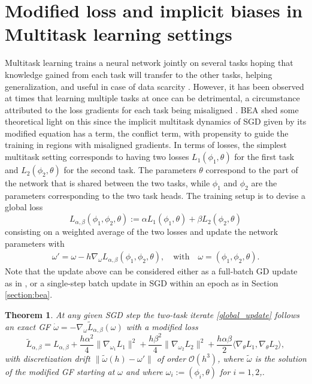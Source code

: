 \documentclass{article}
\newtheorem{theorem}{Theorem}[section]
\begin{document}
\section{Modified loss and implicit biases in Multitask learning settings}

Multitask learning trains a neural network jointly on several tasks hoping that knowledge gained from each task will transfer to the other tasks, helping generalization, and useful in case of data scarcity \cite{ruder2017overview,zhang2021survey}. However, it has been observed at times that learning multiple tasks at once can be detrimental, a circumstance attributed to the loss gradients for each task being misaligned \cite{yu2020gradient_surgery,wang2021gradient_vaccine,lee2022sequential,anguelov2020_pick_a_sign}. BEA shed some theoretical light on this since the implicit multitask dynamics of SGD given by its modified equation has a term, the conflict term, with propensity to guide the training in regions with misaligned gradients. In terms of losses, the simplest multitask setting corresponds to having two losses $L_1(\phi_1, \theta)$ for the first task
and $L_2(\phi_2, \theta)$ for the second task. The parameters $\theta$ correspond to the part of the network
that is shared between the two tasks, while $\phi_1$ and $\phi_2$ are the parameters corresponding to the two task heads. 
The training setup is to devise a global loss 
\begin{equation}\label{eq:multitask_loss}
    L_{\alpha, \beta}(\phi_1, \phi_2, \theta) := \alpha L_1(\phi_1, \theta) + \beta L_2(\phi_2, \theta)
\end{equation}
consisting on a weighted average of the two losses and update the network parameters with 
\begin{eqnarray}
\omega' = \omega - h \nabla_\omega L_{\alpha, \beta}(\phi_1, \phi_2, \theta),
\label{global_update}
\quad\textrm{with}\quad \omega = (\phi_1, \phi_2, \theta).
\end{eqnarray}
Note that the update above can be considered either as a full-batch GD update as in \cite{barrett2021implicit}, or a single-step batch update in SGD within an epoch as in Section \ref{section:bea}.


\begin{theorem}
At any given SGD step the two-task iterate \eqref{global_update} follows an exact GF $\dot \omega = -\nabla_\omega \widetilde L_{\alpha, \beta}(\omega)$ with a modified loss
\begin{equation}\label{eq:two_task_mod_loss}
\widetilde L_{\alpha, \beta}  =  L_{\alpha, \beta} 
+ \frac{h\alpha^2}4 \|\nabla_{\omega_1} L_1 \|^2 
+ \frac{h\beta^2}4  \|\nabla_{\omega_2} L_2 \|^2 
+ \frac{h\alpha\beta}2  \langle \nabla_\theta L_1, \nabla_\theta L_2 \rangle, 
\end{equation}
with discretization drift $\|\tilde \omega(h) - \omega'\|$ of order $\mathcal O(h^3)$, where $\tilde \omega$ is the solution of the modified GF starting at $\omega$ and where $\omega_i:=(\phi_i, \theta)$ for $i=1,2$,.
\end{theorem}
\end{document}
